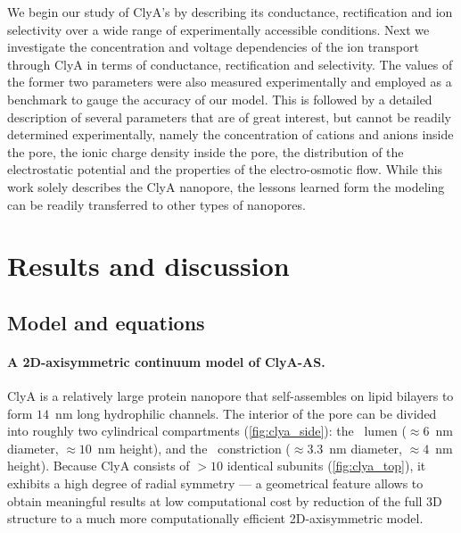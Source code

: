 \documentclass[journal=ancac3,manuscript=article,etalmode=truncate,maxauthors=0,layout=twocolumn]{achemso}
\begin{document}
We begin our study of ClyA's by describing its conductance, rectification and ion selectivity over a wide
range of experimentally accessible conditions. Next we investigate the concentration and voltage dependencies
of the ion transport through ClyA in
terms of conductance, rectification and selectivity. The values of the former two parameters were also
measured experimentally and employed as a benchmark to gauge the accuracy of our model. This is followed by a
detailed description of several parameters that are of great interest, but cannot be readily determined
experimentally, namely the concentration of cations and anions inside the pore, the ionic charge density
inside the pore, the distribution of the electrostatic potential and the properties of the electro-osmotic
flow. While this work solely describes the ClyA nanopore, the lessons learned form the modeling can be
readily transferred to other types of nanopores.

\section{Results and discussion}\label{sect:results}

\subsection{Model and equations}



\paragraph{A 2D-axisymmetric continuum model of ClyA-AS.}
ClyA is a relatively large protein nanopore that self-assembles on lipid bilayers to form $14$~nm long
hydrophilic channels. The interior of the pore can be divided into roughly two cylindrical compartments
(\cref{fig:clya_side}): the \cis\ lumen ($\approx6$~nm diameter, $\approx10$~nm height), and the \trans\
constriction ($\approx3.3$~nm diameter, $\approx4$~nm height). Because ClyA consists of $>10$ identical
subunits (\cref{fig:clya_top}), it exhibits a high degree of radial symmetry --- a geometrical feature allows
to obtain meaningful results at low computational cost by reduction of the full 3D structure to a much more
computationally efficient 2D-axisymmetric model.\cite{Pederson-2015,Lu-2012}
\end{document}
